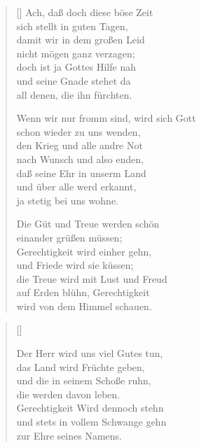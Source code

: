 \begin{multicols}{2}
\begin{verse}[\versewidth]
 Ach, daß doch diese böse Zeit\\
sich stellt in guten Tagen,\\
damit wir in dem großen Leid\\
nicht mögen ganz verzagen;\\
doch ist ja Gottes Hilfe nah\\
und seine Gnade stehet da\\
all denen, die ihn fürchten.

 Wenn wir nur fromm sind, wird sich Gott\\
schon wieder zu uns wenden,\\
den Krieg und alle andre Not\\
nach Wunsch und also enden,\\
daß seine Ehr in unserm Land\\
und über alle werd erkannt,\\
ja stetig bei uns wohne.

 Die Güt und Treue werden schön\\
einander grüßen müssen;\\
Gerechtigkeit wird einher gehn,\\
und Friede wird sie küssen;\\
die Treue wird mit Lust und Freud\\
auf Erden blühn, Gerechtigkeit\\
wird von dem Himmel schauen.

\end{verse}
\end{multicols}

\begin{center}
\settowidth{\versewidth}{Der Herr wird uns viel Gutes tun,}
\begin{verse}[\versewidth]

 Der Herr wird uns viel Gutes tun,\\
das Land wird Früchte geben,\\
und die in seinem Schoße ruhn,\\
die werden davon leben.\\
Gerechtigkeit Wird dennoch stehn\\
und stets in vollem Schwange gehn\\
zur Ehre seines Namens.

\end{verse}
\end{center}
